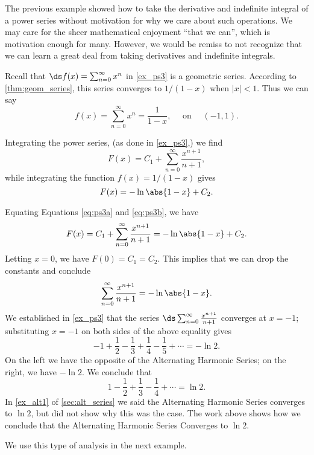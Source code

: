 The previous example showed how to take the derivative and indefinite integral of a power series without motivation for why we care about such operations. We may care for the sheer mathematical enjoyment ``that we can'', which is motivation enough for many. However, we would be remiss to not recognize that we can learn a great deal from taking derivatives and indefinite integrals.\bigskip

Recall that $\ds f(x) = \sum_{n=0}^\infty x^n$ in \autoref{ex_ps3} is a geometric series. According to \autoref{thm:geom_series}, this series converges to $1/(1-x)$ when $|x|<1$. Thus we can say
$$	f(x) = \sum_{n=0}^\infty x^n = \frac 1{1-x},\quad \text{ on }\quad (-1,1).$$

Integrating the power series, (as done in \autoref{ex_ps3},) we find
\begin{equation} F(x)  = C_1+\sum_{n=0}^\infty \frac{x^{n+1}}{n+1},\label{eq:ps3a}\end{equation}
while integrating the function $f(x) = 1/(1-x)$ gives
\begin{equation} F(x)  = -\ln\abs{1-x} + C_2.\label{eq:ps3b}\end{equation}

Equating Equations \eqref{eq:ps3a} and \eqref{eq:ps3b}, we have 
$$F(x) = C_1+\sum_{n=0}^\infty \frac{x^{n+1}}{n+1} = -\ln\abs{1-x} + C_2.$$
Letting $x=0$, we have $F(0) = C_1 = C_2$. This implies that we can drop the constants and conclude
$$\sum_{n=0}^\infty \frac{x^{n+1}}{n+1} = -\ln\abs{1-x}.$$
We established in \autoref{ex_ps3} that the series $\ds\sum_{n=0}^\infty \frac{x^{n+1}}{n+1}$ converges at $x=-1$; substituting $x=-1$ on both sides of the above equality gives
$$-1+\frac12-\frac13+\frac14-\frac15+\dotsb = -\ln 2.$$
On the left we have the opposite of the Alternating Harmonic Series; on the right, we have $-\ln 2$. We conclude that 
$$1-\frac12+\frac13-\frac14+\dotsb = \ln 2.$$
In \autoref{ex_alt1} of \autoref{sec:alt_series} we said the Alternating Harmonic Series converges to $\ln 2$, but did not show why this was the case. The work above shows how we conclude that the Alternating Harmonic Series Converges to $\ln 2$. 

We use this type of analysis in the next example.

